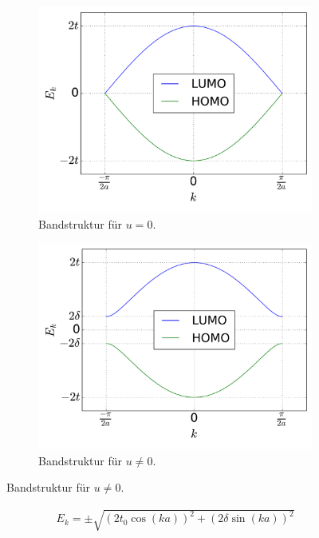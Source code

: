 \begin{frame}
\begin{figure}
	\centering
	\begin{subfigure}{0.49\textwidth}
		\includegraphics[width =\textwidth]{Images/Plots/bandstructure_without_gap}
		\caption{Bandstruktur für $u = 0$.}
		\label{image_bs_wo_gap}
	\end{subfigure}\hspace*{0.2cm}
	\begin{subfigure}{0.49\textwidth}
		\includegraphics[width = \textwidth]{Images/Plots/bandstructure_with_gap}
		\caption{Bandstruktur für $u \neq 0$.}
		\label{image_bs_w_gap}
	\end{subfigure}
\end{figure}
\begin{align*}
	E_k = \pm \sqrt{\left(2t_0\cos(ka)\right)^2 + \left(2\delta\sin(ka)\right)^2}
\end{align*}
\end{frame}